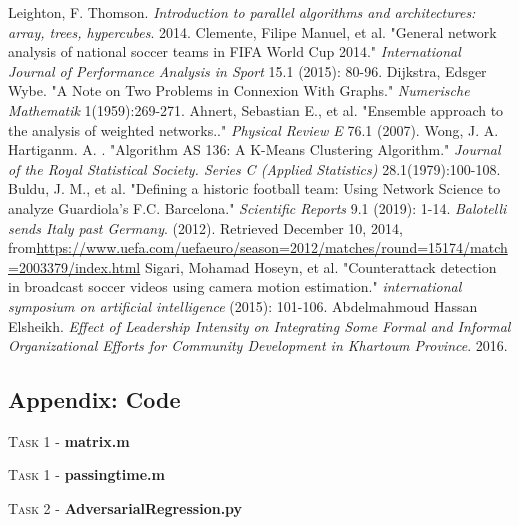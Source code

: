 \documentclass[12pt]{article}  %
\begin{document}
\clearpage
\begin{thebibliography}{99}
     Leighton, F. Thomson. \emph{Introduction to parallel algorithms and architectures: array, trees, hypercubes}. 2014.
     Clemente, Filipe Manuel, et al. "General network analysis of national soccer teams in FIFA World Cup 2014." \emph{International Journal of Performance Analysis in Sport} 15.1 (2015): 80-96.
     Dijkstra, Edsger Wybe. "A Note on Two Problems in Connexion With Graphs." \emph{Numerische Mathematik} 1(1959):269-271.
     Ahnert, Sebastian E., et al. "Ensemble approach to the analysis of weighted networks.." \emph{Physical Review E} 76.1 (2007).
     Wong, J. A. Hartiganm. A. . "Algorithm AS 136: A K-Means Clustering Algorithm." \emph{Journal of the Royal Statistical Society. Series C (Applied Statistics)} 28.1(1979):100-108.
     Buldu, J. M., et al. "Defining a historic football team: Using Network Science to analyze Guardiola’s F.C. Barcelona." \emph{Scientific Reports} 9.1 (2019): 1-14.
     \emph{Balotelli sends Italy past Germany}. (2012). Retrieved December 10, 2014, from\url{https://www.uefa.com/uefaeuro/season=2012/matches/round=15174/match=2003379/index.html}
     Sigari, Mohamad Hoseyn, et al. "Counterattack detection in broadcast soccer videos using camera motion estimation." \emph{international symposium on artificial intelligence} (2015): 101-106.
     Abdelmahmoud Hassan Elsheikh. \emph{Effect of Leadership Intensity on Integrating Some Formal and Informal Organizational Efforts for Community Development in Khartoum Province}. 2016.
\end{thebibliography}
%  
\begin{subappendices}  %

    \section{Appendix: Code}
    \noindent \textsc{Task 1} - \textbf{matrix.m}


\noindent \textsc{Task 1} - \textbf{passingtime.m}


\noindent \textsc{Task 2} - \textbf{AdversarialRegression.py}

       
    \end{subappendices}
\end{document}
